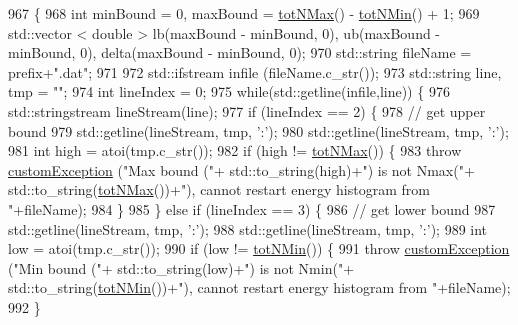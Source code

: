 \begin{DoxyCode}
967                                                               \{
968     \textcolor{keywordtype}{int} minBound = 0, maxBound = \hyperlink{classsim_system_aee2c65ecb43a35c0c4d070cdb45f7dc0}{totNMax}() - \hyperlink{classsim_system_af10842e0eaa638373b8717c87b47e6bc}{totNMin}() + 1;
969     std::vector < double > lb(maxBound - minBound, 0), ub(maxBound - minBound, 0), delta(maxBound - 
      minBound, 0);
970     std::string fileName = prefix+\textcolor{stringliteral}{".dat"};
971 
972     std::ifstream infile (fileName.c\_str());
973     std::string line, tmp = \textcolor{stringliteral}{""};
974     \textcolor{keywordtype}{int} lineIndex = 0;
975     \textcolor{keywordflow}{while}(std::getline(infile,line)) \{
976         std::stringstream lineStream(line);
977         \textcolor{keywordflow}{if} (lineIndex == 2) \{
978             \textcolor{comment}{// get upper bound}
979             std::getline(lineStream, tmp, \textcolor{charliteral}{':'});
980             std::getline(lineStream, tmp, \textcolor{charliteral}{':'});
981             \textcolor{keywordtype}{int} high = atoi(tmp.c\_str());
982             \textcolor{keywordflow}{if} (high != \hyperlink{classsim_system_aee2c65ecb43a35c0c4d070cdb45f7dc0}{totNMax}()) \{
983                 \textcolor{keywordflow}{throw} \hyperlink{classcustom_exception}{customException} (\textcolor{stringliteral}{"Max bound ("}+ std::to\_string(high)+\textcolor{stringliteral}{") is not Nmax("}+
      std::to\_string(\hyperlink{classsim_system_aee2c65ecb43a35c0c4d070cdb45f7dc0}{totNMax}())+\textcolor{stringliteral}{"), cannot restart energy histogram from "}+fileName);
984             \}
985         \} \textcolor{keywordflow}{else} \textcolor{keywordflow}{if} (lineIndex == 3) \{
986             \textcolor{comment}{// get lower bound}
987             std::getline(lineStream, tmp, \textcolor{charliteral}{':'});
988             std::getline(lineStream, tmp, \textcolor{charliteral}{':'});
989             \textcolor{keywordtype}{int} low = atoi(tmp.c\_str());
990             \textcolor{keywordflow}{if} (low != \hyperlink{classsim_system_af10842e0eaa638373b8717c87b47e6bc}{totNMin}()) \{
991                 \textcolor{keywordflow}{throw} \hyperlink{classcustom_exception}{customException} (\textcolor{stringliteral}{"Min bound ("}+ std::to\_string(low)+\textcolor{stringliteral}{") is not Nmin("}+
      std::to\_string(\hyperlink{classsim_system_af10842e0eaa638373b8717c87b47e6bc}{totNMin}())+\textcolor{stringliteral}{"), cannot restart energy histogram from "}+fileName);
992             \}

\end{DoxyCode}

